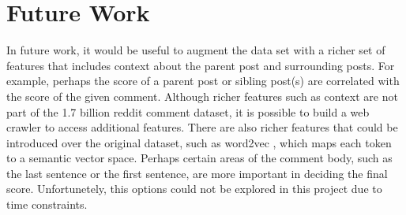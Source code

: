 \documentclass[11pt, twocolumn]{article}
\begin{document}
\section{Future Work}
	
	In future work, it would be useful to augment the data set with a richer set of features that includes context about the parent post and surrounding posts. For example, perhaps the score of a parent post or sibling post(s) are correlated with the score of the given comment. Although richer features such as context are not part of the 1.7 billion reddit comment dataset, it is possible to build a web crawler to access additional features. There are also richer features that could be introduced over the original dataset, such as word2vec \cite{word2vec}, which maps each token to a semantic vector space. Perhaps certain areas of the comment body, such as the last sentence or the first sentence, are more important in deciding the final score. Unfortunetely, this options could not be explored in this project due to time constraints.




\end{document}
